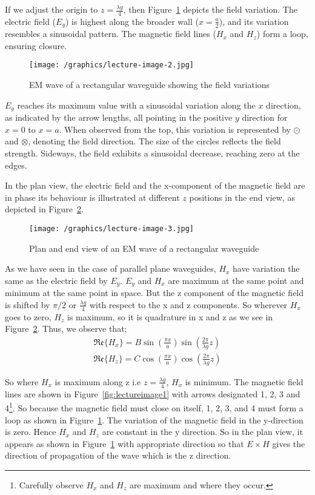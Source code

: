 If we adjust the origin to $z = \frac{\lambda g}{4}$, then Figure~\ref{fig:lectureimage2} depicts the field variation. The electric field ($E_{y}$) is highest along the broader wall ($x = \frac{a}{2}$), and its variation resembles a sinusoidal pattern. The magnetic field lines ($H_{x}$ and $H_{z}$) form a loop, ensuring closure. 
\begin{figure}[h]
\centering
\texttt{[image: /graphics/lecture-image-2.jpg]}
\caption{EM wave of a rectangular waveguide showing the field variations}
\label{fig:lectureimage2}
\end{figure}

$E_{y}$ reaches its maximum value with a sinusoidal variation along the $x$ direction, as indicated by the arrow lengths, all pointing in the positive $y$ direction for $x = 0$ to $x = a$. When observed from the top, this variation is represented by $\odot$ and $\otimes$, denoting the field direction. The size of the circles reflects the field strength. Sideways, the field exhibits a sinusoidal decrease, reaching zero at the edges.

In the plan view, the electric field and the x-component of the magnetic field are in phase its behaviour is illustrated at different $z$ positions in the end view, as depicted in Figure~\ref{fig:lectureimage3}.

\begin{figure}[h]
\centering
\texttt{[image: /graphics/lecture-image-3.jpg]}
\caption{Plan and end view of an EM wave of a rectangular waveguide}
\label{fig:lectureimage3}
\end{figure}

As we have seen in the case of parallel plane waveguides, $H_{x}$ have variation the same as the electric field by $E_{y}$. $E_{y}$ and $H_{x}$ are maximum at the same point and minimum at the same point in space. But the z component of the magnetic field is shifted by $\pi/2$ or $\frac{\lambda g}{4}$ with respect to the x and z components. So wherever $H_{x}$ goes to zero, $H_{z}$ is maximum, so it is quadrature in x and z as we see in Figure~\ref{fig:lectureimage3}. Thus, we observe that;
\begin{align}
\mathfrak{Re}\{H_{x}\} = B\sin(\frac{\pi x}{a})\sin(\frac{2\pi}{\lambda g}z)\\
\mathfrak{Re}\{H_z\} = C\cos(\frac{\pi x}{a})\cos(\frac{2\pi}{\lambda g}z)
\end{align}

So where $H_{x}$ is maximum along z i.e  $z=\frac{\lambda g}{4}$, $H_{x}$ is minimum. The magnetic field lines are shown in Figure~\ref{fig:lectureimage1} with arrows designated 1, 2, 3 and 4\footnote{
Carefully observe $H_{x}$ and $H_{z}$ are maximum and where they occur.
}. So because the magnetic field must close on itself, 1, 2, 3, and 4 must form a loop as shown in Figure~\ref{fig:lectureimage2}. The variation of the magnetic field in the y-direction is zero. Hence $H_{x}$ and $H_{z}$ are constant in the y direction. So in the plan view, it appears as shown in Figure~\ref{fig:lectureimage2} with appropriate direction so that $E\times H$ gives the direction of propagation of the wave which is the z direction.

